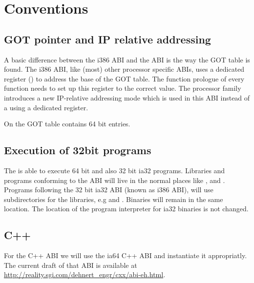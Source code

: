 
\chapter{Conventions}



\section{GOT pointer and IP relative addressing}

A basic difference between the i386 ABI and the \xARCH ABI is the
way the GOT table is found.  The i386 ABI, like (most) other processor
specific ABIs, uses a dedicated register () to address the
base of the GOT table.  The function prologue of every function needs
to set up this register to the correct value.  The \xARCH processor
family introduces a new IP-relative addressing mode which is used in
this ABI instead of a using a dedicated register.

On \xARCH the GOT table contains 64 bit entries.

\section{Execution of 32bit programs}


The \xARCH is able to execute 64 bit \xARCH and also 32 bit ia32
programs.  Libraries and programs conforming to the \xARCH ABI will
live in the normal places like ,  and
.  Programs following the 32 bit ia32 ABI (known as
i386 ABI), will use  subdirectories for the libraries, e.g
 and .  Binaries will remain in
the same location.  The location of the program interpreter for ia32
binaries is not changed.


\section{C++}

For the C++ ABI we will use the ia64 C++ ABI and instantiate it
appropriatly.  The current draft of that ABI is available at
\url{http://reality.sgi.com/dehnert_engr/cxx/abi-eh.html}.


